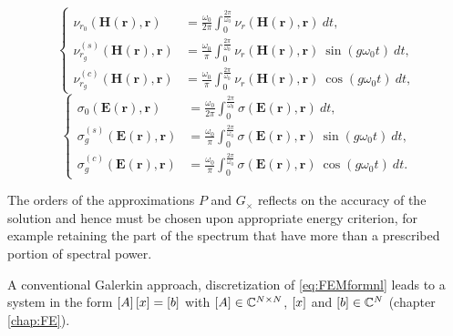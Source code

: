 \begin{equation}
\left\{
\begin{aligned} \label{eq:nuCoeffs}
{\nu}_{r_{0}}(\mathbf{H}(\mathbf{r}),\mathbf{r}) &=  \frac{\omega_0}{2\pi}\int_0^{\frac{2\pi}{\omega_0}}
{\nu}_r(\mathbf{H}(\mathbf{r}),\mathbf{r}) \ dt, \\
{\nu}_{r_{g}}^{(s)}(\mathbf{H}(\mathbf{r}),\mathbf{r}) &=  \frac{\omega_0}{\pi}\int_0^{\frac{2\pi}{\omega_0}}
{\nu}_r(\mathbf{H}(\mathbf{r}),\mathbf{r}) \ \sin(g \omega_0 t) \ dt, \\ 
{\nu}_{r_{g}}^{(c)}(\mathbf{H}(\mathbf{r}),\mathbf{r}) &=  \frac{\omega_0}{\pi}\int_0^{\frac{2\pi}{\omega_0}} 
{\nu}_r(\mathbf{H}(\mathbf{r}),\mathbf{r}) \ \cos(g \omega_0 t) \ dt, 
\end{aligned}
\right.
\end{equation}
\begin{equation}
\left\{
\begin{aligned} \label{eq:sigCoeffs}
{\sigma}_{0}(\mathbf{E}(\mathbf{r}),\mathbf{r}) &=  \frac{\omega_0}{2\pi}\int_0^{\frac{2\pi}{\omega_0}}
{\sigma}(\mathbf{E}(\mathbf{r}),\mathbf{r}) \ dt, \\
{\sigma}_{{g}}^{(s)}(\mathbf{E}(\mathbf{r}),\mathbf{r}) &=  \frac{\omega_0}{\pi}\int_0^{\frac{2\pi}{\omega_0}}
{\sigma}(\mathbf{E}(\mathbf{r}),\mathbf{r}) \ \sin(g \omega_0 t) \ dt, \\ 
{\sigma}_{{g}}^{(c)}(\mathbf{E}(\mathbf{r}),\mathbf{r}) &=  \frac{\omega_0}{\pi}\int_0^{\frac{2\pi}{\omega_0}} 
{\sigma}(\mathbf{E}(\mathbf{r}),\mathbf{r}) \ \cos(g \omega_0 t) \ dt.
\end{aligned}
\right.
\end{equation}

The orders of the approximations $P$ and $G_\times$ reflects on the accuracy of the solution and hence must be chosen upon appropriate energy criterion, for example retaining the part of the spectrum that have more than a prescribed portion of spectral power.

A conventional Galerkin approach, discretization of \eqref{eq:FEMformnl} 
leads to a system in the form $\left[A\right]\left[{{x}}\right] = \left[{{b}}\right]$ with $\left[A\right] \in \mathbb{C}^{N \times N}$, $\left[{{x}}\right]$ and $\left[{{b}}\right] \in \mathbb{C}^{N}$ (chapter \ref{chap:FE}).

